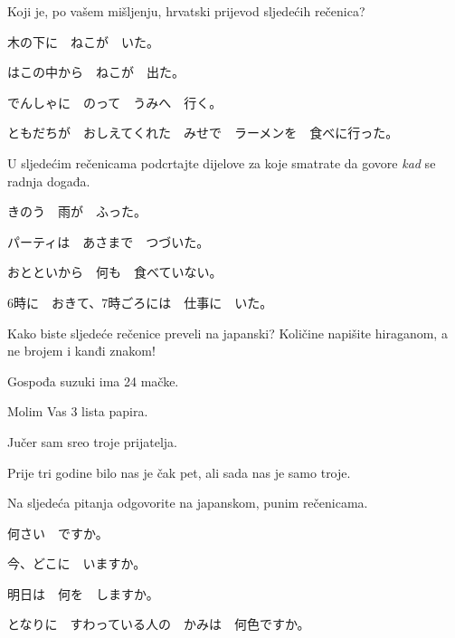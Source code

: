 
\author{Tomislav Mamić}

	
	\begin{mondai}{Koji je, po vašem mišljenju, hrvatski prijevod sljedećih rečenica?}
		\item 木の下に　ねこが　いた。
		\item はこの中から　ねこが　出た。
		\item でんしゃに　のって　うみへ　行く。
		\item ともだちが　おしえてくれた　みせで　ラーメンを　食べに行った。
	\end{mondai}

	\begin{mondai}{U sljedećim rečenicama podcrtajte dijelove za koje smatrate da govore \textit{kad} se radnja događa.}
		\item きのう　雨が　ふった。
		\item パーティは　あさまで　つづいた。
		\item おとといから　何も　食べていない。
		\item 6時に　おきて、7時ごろには　仕事に　いた。
	\end{mondai}

	\begin{mondai}{Kako biste sljedeće rečenice preveli na japanski? Količine napišite hiraganom, a ne brojem i kanđi znakom!}
		\item Gospođa suzuki ima 24 mačke.
		\item Molim Vas 3 lista papira.
		\item Jučer sam sreo troje prijatelja.
		\item Prije tri godine bilo nas je čak pet, ali sada nas je samo troje.
	\end{mondai}

	\begin{mondai}{Na sljedeća pitanja odgovorite na japanskom, punim rečenicama.}
		\item 何さい　ですか。
		\item 今、どこに　いますか。
		\item 明日は　何を　しますか。
		\item となりに　すわっている人の　かみは　何色ですか。
	\end{mondai}

